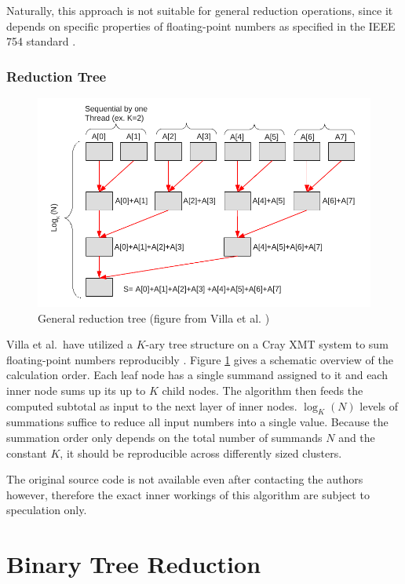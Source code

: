 Naturally, this approach is not suitable for general reduction operations, since it depends on specific properties of floating-point numbers as specified in the IEEE 754 standard \cite{noauthor_ieee_nodate-1}.


\subsection{Reduction Tree}
\label{sec:ReductionTree}

\begin{figure}[H]
\centering
\includegraphics[scale=0.7]{figures/villa_et_al_reduction_tree.pdf}
\caption{General reduction tree (figure from Villa et al. \cite{villa_effects_2009})}
\label{fig:villa_reduction_tree}
\end{figure}


Villa et al.\ have utilized a $K$-ary tree structure on a Cray XMT system to sum floating-point numbers reproducibly \cite{villa_effects_2009}.
Figure \ref{fig:villa_reduction_tree} gives a schematic overview of the calculation order. Each leaf node has a single summand assigned to it
and each inner node sums up its up to $K$ child nodes. The algorithm then feeds the computed subtotal as input to the next layer of inner nodes.
$\log_K (N)$ levels of summations suffice to reduce all input numbers into a single value. Because the summation order only depends on the total number
of summands $N$ and the constant $K$, it should be reproducible across differently sized clusters.

The original source code is not available even after contacting the authors however, therefore the exact inner workings of this algorithm are
subject to speculation only.

\chapter{Binary Tree Reduction}
\label{ch:BinaryTreeSummation}

